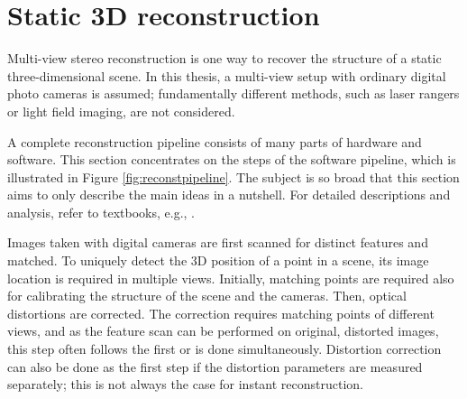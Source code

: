 

\clearpage
\section{Static 3D reconstruction} \label{sec:static3d} %

Multi-view stereo reconstruction is one way to recover the structure of a static three-dimensional scene.
In this thesis, a multi-view setup with ordinary digital photo cameras is assumed;
fundamentally different methods, such as laser rangers or light field imaging, are not considered.

A complete reconstruction pipeline consists of many parts of hardware and software.
This section concentrates on the steps of the software pipeline, which is illustrated in Figure \ref{fig:reconstpipeline}.
The subject is so broad that this section aims to only describe the main ideas in a nutshell.
For detailed descriptions and analysis, refer to textbooks, e.g., \cite{hartley03multiview,heyden2005multiple,szeliski10vision}.

Images taken with digital cameras are first scanned for distinct features and matched.
To uniquely detect the 3D position of a point in a scene, its image location is required in multiple views.
Initially, matching points are required also for calibrating the structure of the scene and the cameras.
Then, optical distortions are corrected.
The correction requires matching points of different views, and as the feature scan can be performed on original, distorted images, this step often follows the first or is done simultaneously.
Distortion correction can also be done as the first step if the distortion parameters are measured separately; this is not always the case for instant reconstruction.

